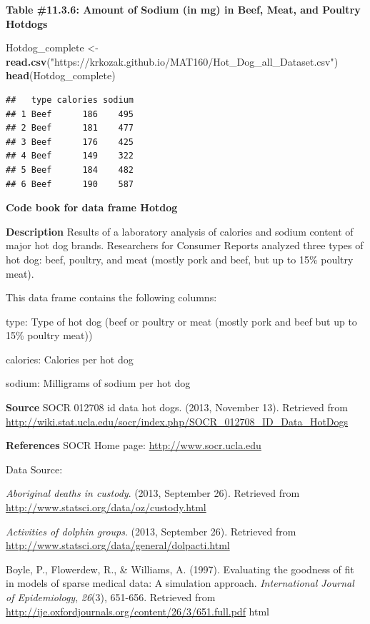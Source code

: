 \documentclass[
]{book}
\newenvironment{Shaded}{\begin{snugshade}}{\end{snugshade}}
\newcommand{\KeywordTok}[1]{\textcolor[rgb]{0.13,0.29,0.53}{\textbf{#1}}}
\newcommand{\NormalTok}[1]{#1}
\newcommand{\StringTok}[1]{\textcolor[rgb]{0.31,0.60,0.02}{#1}}
\begin{document}
\textbf{Table \#11.3.6: Amount of Sodium (in mg) in Beef, Meat, and Poultry Hotdogs}

\begin{Shaded}
\begin{Highlighting}[]
\NormalTok{Hotdog_complete <-}\StringTok{ }\KeywordTok{read.csv}\NormalTok{(}\StringTok{"https://krkozak.github.io/MAT160/Hot_Dog_all_Dataset.csv"}\NormalTok{)}
\KeywordTok{head}\NormalTok{(Hotdog_complete)}
\end{Highlighting}
\end{Shaded}

\begin{verbatim}
##   type calories sodium
## 1 Beef      186    495
## 2 Beef      181    477
## 3 Beef      176    425
## 4 Beef      149    322
## 5 Beef      184    482
## 6 Beef      190    587
\end{verbatim}

\textbf{Code book for data frame Hotdog}

\textbf{Description}
Results of a laboratory analysis of calories and sodium content of major hot dog brands. Researchers for Consumer Reports analyzed three types of hot dog: beef, poultry, and meat (mostly pork and beef, but up to 15\% poultry meat).

This data frame contains the following columns:

type: Type of hot dog (beef or poultry or meat (mostly pork and beef but up to 15\% poultry meat))

calories: Calories per hot dog

sodium: Milligrams of sodium per hot dog

\textbf{Source}
SOCR 012708 id data hot dogs. (2013, November 13). Retrieved from
\url{http://wiki.stat.ucla.edu/socr/index.php/SOCR_012708_ID_Data_HotDogs}

\textbf{References}
SOCR Home page: \url{http://www.socr.ucla.edu}

Data Source:

\emph{Aboriginal deaths in custody}. (2013, September 26). Retrieved from
\url{http://www.statsci.org/data/oz/custody.html}

\emph{Activities of dolphin groups}. (2013, September 26). Retrieved from
\url{http://www.statsci.org/data/general/dolpacti.html}

Boyle, P., Flowerdew, R., \& Williams, A. (1997). Evaluating the goodness
of fit in models of sparse medical data: A simulation approach.
\emph{International Journal of Epidemiology}, \emph{26}(3), 651-656. Retrieved
from \url{http://ije.oxfordjournals.org/content/26/3/651.full.pdf} html
\end{document}
